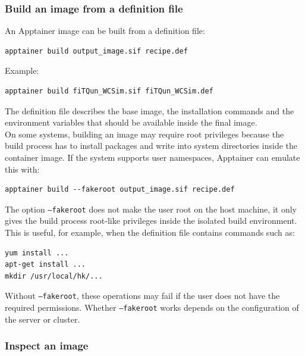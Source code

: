 \documentclass{article}
\numberwithin{table}{subsection}
\numberwithin{figure}{subsection}
\numberwithin{equation}{subsection}
\numberwithin{footnote}{subsection}
\begin{document}
\subsubsection{Build an image from a definition file}

An Apptainer image can be built from a definition file:

\begin{lstlisting}[style=terminal]
apptainer build output_image.sif recipe.def
\end{lstlisting}
Example:
\begin{lstlisting}[style=terminal]
apptainer build fiTQun_WCSim.sif fiTQun_WCSim.def
\end{lstlisting}
The definition file describes the base image, the installation commands and the environment variables that should be available inside the final image.\\
On some systems, building an image may require root privileges because the build process has to install packages and write into system directories inside the container image. If the system supports user namespaces, Apptainer can emulate
this with:
\begin{lstlisting}[style=terminal]
apptainer build --fakeroot output_image.sif recipe.def
\end{lstlisting}
The option \texttt{--fakeroot} does not make the user root on the host machine, it only gives the build process root-like privileges inside the isolated build environment. This is useful, for example, when the definition file contains
commands such as:
\begin{lstlisting}[style=terminal]
yum install ...
apt-get install ...
mkdir /usr/local/hk/...
\end{lstlisting}
Without \texttt{--fakeroot}, these operations may fail if the user does not have the required permissions. Whether \texttt{--fakeroot} works depends on the configuration of the server or cluster.

\subsubsection{Inspect an image}
\end{document}
